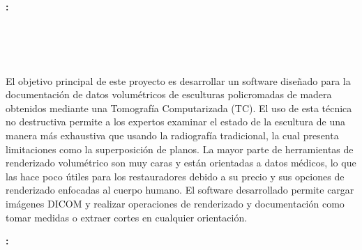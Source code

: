 \chapter*{}



\cleardoublepage
\thispagestyle{empty}

\begin{center}
{\large\bfseries \myTitle: \mySubtitle}\\
\end{center}

\begin{center}
\myName \\
\end{center}

\vspace{0.7cm}
\\

\vspace{0.7cm}
\\

El objetivo principal de este proyecto es desarrollar un software diseñado para la documentación de datos volumétricos de esculturas policromadas de madera obtenidos mediante una Tomografía Computarizada (TC). El uso de esta técnica no destructiva permite a los expertos examinar el estado de la escultura de una manera más exhaustiva que usando la radiografía tradicional, la cual presenta limitaciones como la superposición de planos. La mayor parte de herramientas de renderizado volumétrico son muy caras y están orientadas a datos médicos, lo que las hace poco útiles para los restauradores debido a su precio y sus opciones de renderizado enfocadas al cuerpo humano. El software desarrollado permite cargar imágenes DICOM y realizar operaciones de renderizado y documentación como tomar medidas o extraer cortes en cualquier orientación.

\thispagestyle{empty}

\cleardoublepage

\begin{center}
	{\large\bfseries \myTitle: \myEnglishSubtitle}\\
\end{center}

\begin{center}
	\myName \\
\end{center}

